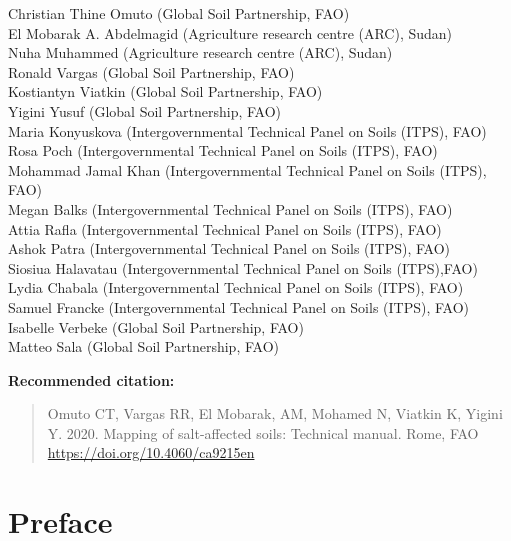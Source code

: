 \documentclass[
  10pt,
  b5paper,
]{book}
\begin{document}
Christian Thine Omuto (Global Soil Partnership, FAO)\\
El Mobarak A. Abdelmagid (Agriculture research centre (ARC), Sudan)\\
Nuha Muhammed (Agriculture research centre (ARC), Sudan)\\
Ronald Vargas (Global Soil Partnership, FAO)\\
Kostiantyn Viatkin (Global Soil Partnership, FAO)\\
Yigini Yusuf (Global Soil Partnership, FAO)\\
Maria Konyuskova (Intergovernmental Technical Panel on Soils (ITPS), FAO)\\
Rosa Poch (Intergovernmental Technical Panel on Soils (ITPS), FAO)\\
Mohammad Jamal Khan (Intergovernmental Technical Panel on Soils (ITPS), FAO)\\
Megan Balks (Intergovernmental Technical Panel on Soils (ITPS), FAO)\\
Attia Rafla (Intergovernmental Technical Panel on Soils (ITPS), FAO)\\
Ashok Patra (Intergovernmental Technical Panel on Soils (ITPS), FAO)\\
Siosiua Halavatau (Intergovernmental Technical Panel on Soils (ITPS),FAO)\\
Lydia Chabala (Intergovernmental Technical Panel on Soils (ITPS), FAO)\\
Samuel Francke (Intergovernmental Technical Panel on Soils (ITPS), FAO)\\
Isabelle Verbeke (Global Soil Partnership, FAO)\\
Matteo Sala (Global Soil Partnership, FAO)

\textbf{Recommended citation:}

\begin{quote}
Omuto CT, Vargas RR, El Mobarak, AM, Mohamed N, Viatkin K, Yigini Y. 2020. Mapping of salt-affected soils: Technical manual. Rome, FAO
\url{https://doi.org/10.4060/ca9215en}
\end{quote}

\hypertarget{preface}{%
\chapter*{Preface}\label{preface}}
\end{document}
